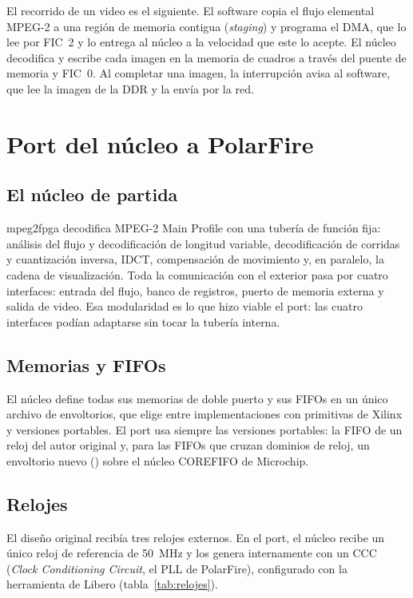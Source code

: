 El recorrido de un video es el siguiente. El software copia el flujo
elemental MPEG-2 a una región de memoria contigua (\emph{staging}) y programa
el DMA, que lo lee por FIC~2 y lo entrega al núcleo a la velocidad que este
lo acepte. El núcleo decodifica y escribe cada imagen en la memoria de
cuadros a través del puente de memoria y FIC~0. Al completar una imagen, la
interrupción avisa al software, que lee la imagen de la DDR y la envía por la
red.

\section{Port del núcleo a PolarFire}
\label{sec:port}

\subsection{El núcleo de partida}

mpeg2fpga \citep{De_Vleeschauwer_2017} decodifica MPEG-2 Main Profile con una
tubería de función fija: análisis del flujo y decodificación de longitud
variable, decodificación de corridas y cuantización inversa, IDCT,
compensación de movimiento y, en paralelo, la cadena de visualización. Toda
la comunicación con el exterior pasa por cuatro interfaces: entrada del
flujo, banco de registros, puerto de memoria externa y salida de video. Esa
modularidad es lo que hizo viable el port: las cuatro interfaces podían
adaptarse sin tocar la tubería interna.

\subsection{Memorias y FIFOs}

El núcleo define todas sus memorias de doble puerto y sus FIFOs en un único
archivo de envoltorios, que elige entre implementaciones con primitivas de
Xilinx y versiones portables. El port usa siempre las versiones portables:
la FIFO de un reloj del autor original y, para las FIFOs que cruzan dominios
de reloj, un envoltorio nuevo () sobre el núcleo COREFIFO de
Microchip.

\subsection{Relojes}

El diseño original recibía tres relojes externos. En el port, el núcleo
recibe un único reloj de referencia de 50~MHz y los genera internamente
con un CCC (\emph{Clock Conditioning Circuit}, el PLL de PolarFire),
configurado con la herramienta de Libero (tabla~\ref{tab:relojes}).

